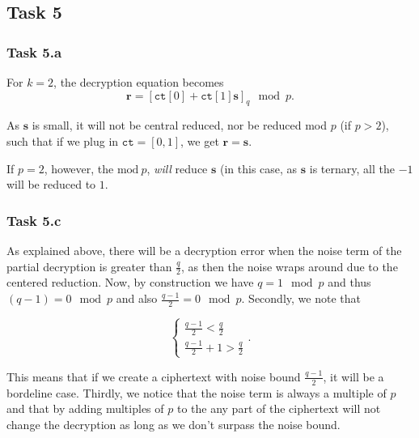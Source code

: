 \documentclass{article}
\begin{document}
\subsection*{Task 5}

\subsubsection*{Task 5.a}

For $k = 2$, the decryption equation becomes
\begin{equation}
  \mathbf{r} = \left[\texttt{ct}[0] + \texttt{ct}[1] \mathbf{s}\right]_q \mod p.
\end{equation} 

\noindent As $\mathbf{s}$ is small, it will not be central reduced, nor be
reduced mod $p$ (if $p > 2$), such that if we plug in $\texttt{ct} = [0, 1]$,
we get $\mathbf{r} = \mathbf{s}$.

If $p = 2$, however, the $\text{mod}\ p$, \textit{will} reduce $\mathbf{s}$ (in
this case, as $\mathbf{s}$ is ternary, all the $-1$ will be reduced to $1$.

\subsubsection*{Task 5.c}

As explained above, there will be a decryption error when the noise term of the
partial decryption is greater than $\frac{q}{2}$, as then the noise wraps around
due to the centered reduction. Now, by construction we have $q = 1 \mod p$ and
thus $(q - 1) = 0 \mod p$ and also $\frac{q-1}{2} = 0 \mod p$. Secondly, we note
that

\begin{equation}
  \begin{cases}
    \frac{q-1}{2} < \frac{q}{2} \\
    \frac{q-1}{2} + 1 > \frac{q}{2}
  \end{cases}.
\end{equation} 

\noindent This means that if we create a ciphertext with noise bound
$\frac{q-1}{2}$, it will be a bordeline case. Thirdly, we notice that the noise
term is always a multiple of $p$ and that by adding multiples of $p$ to the
any part of the ciphertext will not change the decryption as long as we don't
surpass the noise bound.
\end{document}
